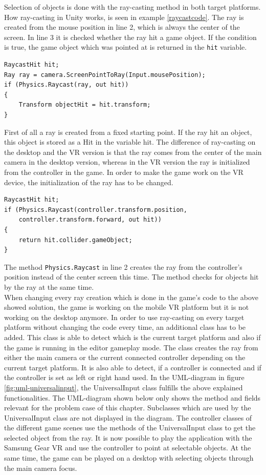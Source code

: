 Selection of objects is done with the ray-casting method in both target platforms. How ray-casting in Unity works, is seen in example \ref{raycastcode}. The ray is created from the mouse position in line 2, which is always the center of the screen. In line 3 it is checked whether the ray hit a game object. If the condition is true, the game object which was pointed at is returned in the \texttt{hit} variable.
\begin{lstlisting} 
RaycastHit hit;
Ray ray = camera.ScreenPointToRay(Input.mousePosition);
if (Physics.Raycast(ray, out hit))
{
    Transform objectHit = hit.transform;
}
\end{lstlisting}
\label{raycastcode}
First of all a ray is created from a fixed starting point. If the ray hit an object, this object is stored as a Hit in the variable hit. The difference of ray-casting on the desktop and the VR version is that the ray comes from the center of the main camera in the desktop version, whereas in the VR version the ray is initialized from the controller in the game. In order to make the game work on the VR device, the initialization of the ray has to be changed.
\begin{lstlisting} 
RaycastHit hit;
if (Physics.Raycast(controller.transform.position,
    controller.transform.forward, out hit))
{
    return hit.collider.gameObject;
}
\end{lstlisting}
\label{raycastcode-new}

The method \texttt{Physics.Raycast} in line 2 creates the ray from the controller's position instead of the center screen this time. The method checks for objects hit by the ray at the same time.\\
When changing every ray creation which is done in the game's code to the above showed solution, the game is working on the mobile VR platform but it is not working on the desktop anymore. In order to use ray-casting on every target platform without changing the code every time, an additional class has to be added. This class is able to detect which is the current target platform and also if the game is running in the editor gameplay mode. The class creates the ray from either the main camera or the current connected controller depending on the current target platform. It is also able to detect, if a controller is connected and if the controller is set as left or right hand used. In the UML-diagram in figure \ref{fig:uml-universalinput}, the UniversalInput class fulfills the above explained functionalities. The UML-diagram shown below only shows the method and fields relevant for the problem case of this chapter. Subclasses which are used by the UniversalInput class are not displayed in the diagram. The controller classes of the different game scenes use the methods of the UniversalInput class to get the selected object from the ray. It is now possible to play the application with the Samsung Gear VR and use the controller to point at selectable objects. At the same time, the game can be played on a desktop with selecting objects through the main camera focus.

